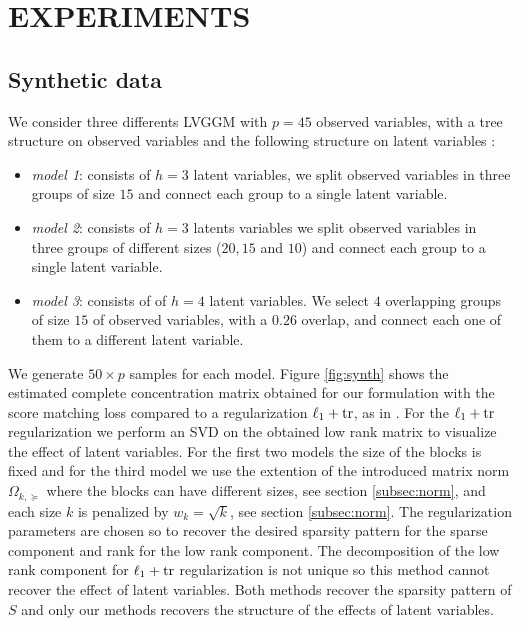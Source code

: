 \section{EXPERIMENTS}
\label{experiments}

\subsection{Synthetic data}

We consider three differents LVGGM with $p=45$ observed variables, with a tree structure on observed variables and the following structure on latent variables :
\begin{itemize}
\item \textit{model 1}: consists of $h=3$ latent variables, we split observed variables in three groups of size $15$ and connect each group to a single latent variable.
\item \textit{model 2}: consists of $h=3$ latents variables we split observed variables in three groups of different sizes ($20,15$ and $10$) and connect each group to a single latent variable.
\item \textit{model 3}: consists of of $h=4$ latent variables. We select $4$ overlapping groups of size $15$ of observed variables, with a $0.26$ overlap, and connect each one of them to a different latent variable.
\end{itemize}


We generate $50\times p$ samples for each model. Figure \ref{fig:synth} shows the estimated complete concentration matrix obtained for our formulation with the score matching loss compared to a regularization $\ell_1+{\rm tr}$, as in \citet{chandrasekaran2010}. For  the $\ell_1+{\rm tr}$ regularization we perform an SVD on the obtained low rank matrix to visualize the effect of latent variables. For the first two models the size of the blocks is fixed and for the third model we use the extention of the introduced matrix norm $\Omega_{k,\succeq}$ where the blocks can have different sizes, see section \ref{subsec:norm},  and each size $k$ is penalized by $w_{k}=\sqrt{k}$, see section \ref{subsec:norm}. The regularization parameters are chosen so to recover the desired sparsity pattern for the sparse component and rank for the low rank component.  The decomposition of the low rank component for $\ell_1+{\rm tr}$ regularization is not unique so this method cannot recover the effect of latent variables. Both methods recover the sparsity pattern of $S$ and only our methods recovers the structure of the effects of latent variables.

